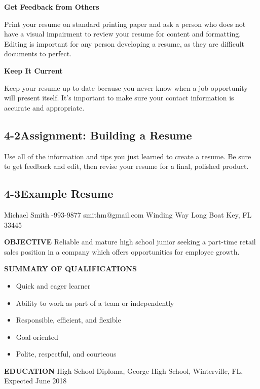 \textbf{Get Feedback from Others}

Print your resume on standard printing paper and ask a person who does not have a visual impairment to review your resume for content and formatting. Editing is important for any person developing a resume, as they are difficult documents to perfect.

\textbf{Keep It Current}

Keep your resume up to date because you never know when a job opportunity will present itself. It's important to make sure your contact information is accurate and appropriate.

\pagebreak \subsection*{4-2\quad Assignment: Building a Resume}
Use all of the information and tips you just learned to create a resume. Be sure to get feedback and edit, then revise your resume for a final, polished product.
 
\pagebreak \subsection*{4-3\quad Example Resume}

Michael Smith
-993-9877
\break smithm@gmail.com 
 Winding Way
\break Long Boat Key, FL 33445

\textbf{OBJECTIVE}
\break Reliable and mature high school junior seeking a part-time retail sales position in a company which offers opportunities for employee growth.

\textbf{SUMMARY OF QUALIFICATIONS}
\begin{itemize}
\item Quick and eager learner
\item Ability to work as part of a team or independently
\item Responsible, efficient, and flexible
\item Goal-oriented
\item Polite, respectful, and courteous
\end{itemize}
\textbf{EDUCATION}
\break High School Diploma, George High School, Winterville, FL, Expected June 2018

